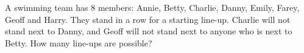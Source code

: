 A swimming team has $8$ members: Annie, Betty, Charlie, Danny, Emily, Farey, Geoff and Harry. They stand in a row for a starting line-up. Charlie will not stand next to Danny, and Geoff will not stand next to anyone who is next to Betty. How many line-ups are possible?
